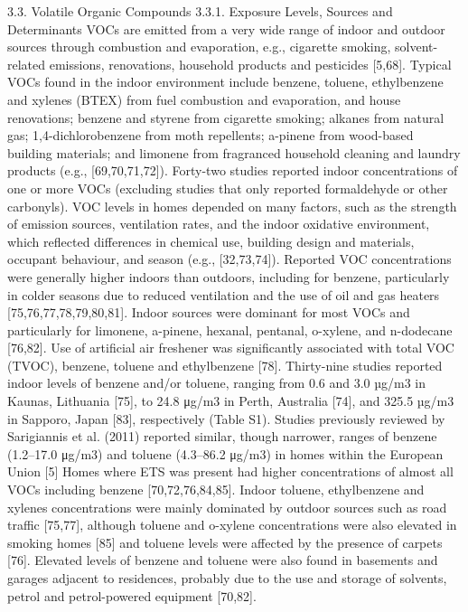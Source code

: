 3.3. Volatile Organic Compounds
3.3.1. Exposure Levels, Sources and Determinants
VOCs are emitted from a very wide range of indoor and outdoor sources through combustion and evaporation, e.g., cigarette smoking, solvent-related emissions, renovations, household products and pesticides [5,68]. Typical VOCs found in the indoor environment include benzene, toluene, ethylbenzene and xylenes (BTEX) from fuel combustion and evaporation, and house renovations; benzene and styrene from cigarette smoking; alkanes from natural gas; 1,4-dichlorobenzene from moth repellents; a-pinene from wood-based building materials; and limonene from fragranced household cleaning and laundry products (e.g., [69,70,71,72]).
Forty-two studies reported indoor concentrations of one or more VOCs (excluding studies that only reported formaldehyde or other carbonyls). VOC levels in homes depended on many factors, such as the strength of emission sources, ventilation rates, and the indoor oxidative environment, which reflected differences in chemical use, building design and materials, occupant behaviour, and season (e.g., [32,73,74]). Reported VOC concentrations were generally higher indoors than outdoors, including for benzene, particularly in colder seasons due to reduced ventilation and the use of oil and gas heaters [75,76,77,78,79,80,81]. Indoor sources were dominant for most VOCs and particularly for limonene, a-pinene, hexanal, pentanal, o-xylene, and n-dodecane [76,82]. Use of artificial air freshener was significantly associated with total VOC (TVOC), benzene, toluene and ethylbenzene [78].
Thirty-nine studies reported indoor levels of benzene and/or toluene, ranging from 0.6 and 3.0 µg/m3 in Kaunas, Lithuania [75], to 24.8 μg/m3 in Perth, Australia [74], and 325.5 µg/m3 in Sapporo, Japan [83], respectively (Table S1). Studies previously reviewed by Sarigiannis et al. (2011) reported similar, though narrower, ranges of benzene (1.2–17.0 μg/m3) and toluene (4.3–86.2 μg/m3) in homes within the European Union [5]
Homes where ETS was present had higher concentrations of almost all VOCs including benzene [70,72,76,84,85]. Indoor toluene, ethylbenzene and xylenes concentrations were mainly dominated by outdoor sources such as road traffic [75,77], although toluene and o-xylene concentrations were also elevated in smoking homes [85] and toluene levels were affected by the presence of carpets [76]. Elevated levels of benzene and toluene were also found in basements and garages adjacent to residences, probably due to the use and storage of solvents, petrol and petrol-powered equipment [70,82].
